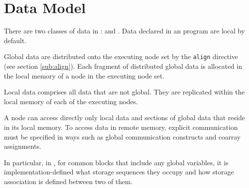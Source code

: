 \section{Data Model}


There are two classes of data in {\XMP}: {\it {}} and
{\it {}}. Data declared in an {\XMP} program are local by
default.

Global data are distributed onto the executing node set by
the {\tt align} directive (see section \ref{sub:align}). Each fragment
of distributed global data is allocated in the local memory of a node in the
executing node set.
%
%

Local data comprises all data that are not global. They are replicated
within the local memory of each of the executing nodes.


A node can access directly only local data and sections of global data
that reside in its local memory.
%
To access data in remote memory, explicit communication must be
specified in ways such as global communication constructs and
coarray assignments.


In particular, in {\XMPF}, for common blocks that include any global
variables, it is implementation-defined what storage sequences they
occupy and how storage association is defined between two of them.

